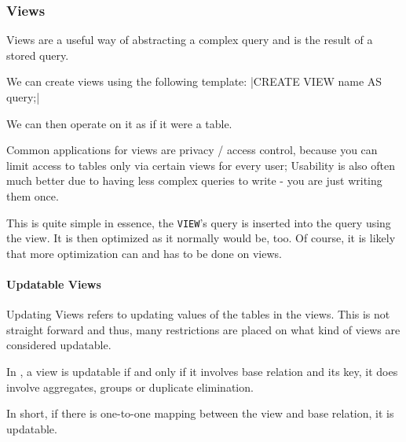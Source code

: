 \subsubsection{Views}
Views are a useful way of abstracting a complex query and is the result of a stored query.

We can create views using the following template:
|CREATE VIEW name AS query;|

We can then operate on it as if it were a table.

Common applications for views are privacy / access control, because you can limit access to tables only via certain views for every user;
Usability is also often much better due to having less complex queries to write - you are just writing them once.

This is quite simple in essence, the \texttt{VIEW}'s query is inserted into the query using the view.
It is then optimized as it normally would be, too. Of course, it is likely that more optimization can and has to be done on views.


\paragraph{Updatable Views}
Updating Views refers to updating values of the tables in the views.
This is not straight forward and thus, many restrictions are placed on what kind of views are considered updatable.

In \sql, a view is updatable if and only if it involves  base relation and its key, it does  involve aggregates, groups or duplicate elimination.

In short, if there is one-to-one mapping between the view and base relation, it is updatable.

